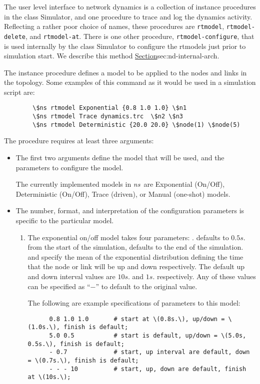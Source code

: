 The user level interface to network dynamics is a collection 
of instance procedures in the class Simulator,
and one procedure to trace and log the dynamics activity.
Reflecting a rather poor choice of names,
these procedures are
{\tt rtmodel}, {\tt rtmodel-delete}, and {\tt rtmodel-at}.
There is one other procedure, {\tt rtmodel-configure},
that is used internally by the class Simulator to configure
the rtmodels just prior to simulation start.
We describe this method \href{later}{Section}{sec:nd-internal-arch}.
\begin{list}{---}{}
\item The instance procedure
defines a model to be applied to the nodes and links in the topology.
Some examples of this command as it would be used in a simulation script are:
\begin{verbatim}
        \$ns rtmodel Exponential {0.8 1.0 1.0} \$n1
        \$ns rtmodel Trace dynamics.trc  \$n2 \$n3
        \$ns rtmodel Deterministic {20.0 20.0} \$node(1) \$node(5)
\end{verbatim}
The procedure requires at least three arguments:
\begin{itemize}
\item %
The first two arguments define the model that will be used, and the
parameters to configure the model.

The currently implemented models in \emph{ns}\ are
Exponential (On/Off), Deterministic (On/Off), Trace (driven), or
Manual (one-shot) models.

\item %
The number, format, and interpretation of the configuration parameters
is specific to the particular model.
\begin{enumerate}\itemsep0pt
\item The exponential on/off model takes four parameters:
.
 defaults to $0.5s.$ from the start of the simulation,
 defaults to the end of the simulation.
 and  specify
the mean of the exponential distribution defining the time
that the node or link will be up and down respectively.
The default up and down interval values are $10s.$ and $1s.$ respectively.
Any of these values can be specified as ``$-$'' to default to the
original value.

The following are example specifications of parameters to this model:
\begin{verbatim}
      0.8 1.0 1.0       # start at \(0.8s.\), up/down = \(1.0s.\), finish is default;
      5.0 0.5           # start is default, up/down = \(5.0s, 0.5s.\), finish is default;
      - 0.7             # start, up interval are default, down = \(0.7s.\), finish is default;
      - - - 10          # start, up, down are default, finish at \(10s.\);
\end{verbatim}


\end{enumerate}
\end{itemize}
\end{list}
